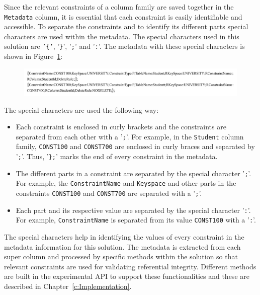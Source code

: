 Since the relevant constraints of a column family are saved
together in the \texttt{Metadata} column,  it is essential that each constraint
is easily identifiable and accessible.  To separate
the constraints and to identify its different parts special characters are used within the
metadata.  The special characters used in this solution are \texttt{'\{'}, 
'\texttt{\}}', '\texttt{;}' and '\texttt{:}'. 
The metadata with these special characters is shown in
Figure~\ref{fd:Metadata-Solution1-String}:

		\begin{figure}[H]
			\centering
			\includegraphics[width=.8\textwidth]{./figure/Solutions/Solution1-MD-String.png}
			\label{fd:Metadata-Solution1-String}
		\end{figure}
The special characters are used the following way:
	
		\begin{itemize}
			\item Each constraint is enclosed in curly brackets and the
			constraints are separated from each other with a
			'\texttt{;}'.  For example, in the \texttt{Student} column
			family,  \texttt{CONST100} and \texttt{CONST700} are enclosed in curly braces
			and separated by '\texttt{;}'. 
			Thus,  '\texttt{\};}' marks the end of every constraint in the metadata. 
		
		
			\item The different parts in a constraint are separated by the special character
			'\texttt{;}'.  For example,  the \texttt{ConstraintName}
			and \texttt{Keyspace} and other parts in the constraints \texttt{CONST100} and
						 \texttt{CONST700} are separated with a '\texttt{;}'. 
			 
			 
			\item Each part and its respective value are separated by the special
			character '\texttt{:}'.  For example,  \texttt{ConstraintName} is separated from
			its value \texttt{CONST100} with a '\texttt{:}'.  
			
		\end{itemize}
		

		
The special characters help in identifying the values of every constraint in the
metadata information for this solution.  The metadata is extracted from each
super column and processed by specific methods within the solution so that
relevant constraints are used for validating referential integrity.  Different
methods are built in the experimental \ac{API} to support these functionalities
and these are described in Chapter~\ref{c:Implementation}. 

